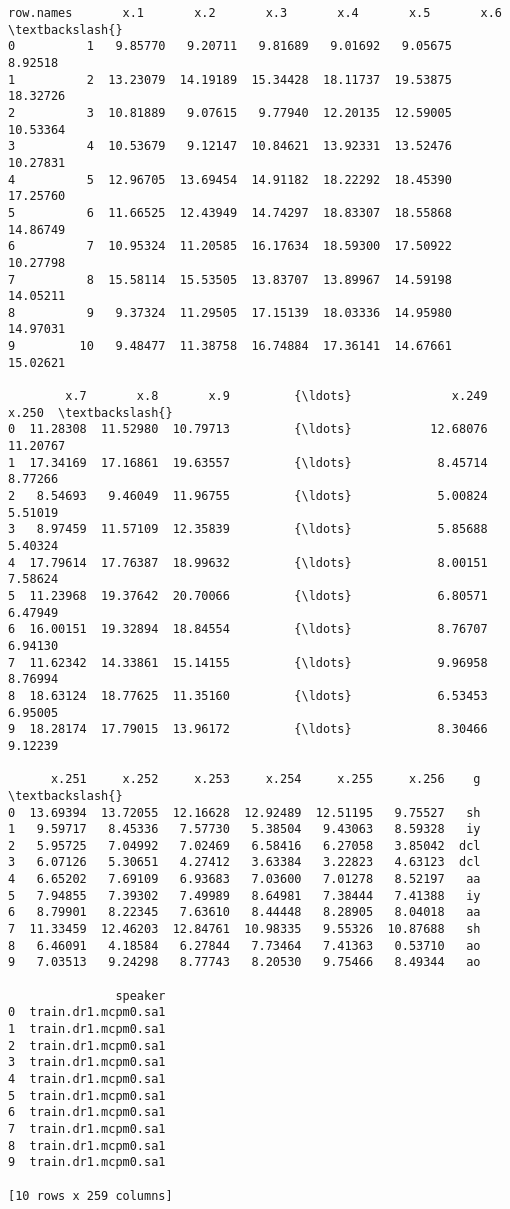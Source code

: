 \documentclass[11pt]{article}
\begin{document}
    \begin{Verbatim}[commandchars=\\\{\}]
   row.names       x.1       x.2       x.3       x.4       x.5       x.6  \textbackslash{}
0          1   9.85770   9.20711   9.81689   9.01692   9.05675   8.92518   
1          2  13.23079  14.19189  15.34428  18.11737  19.53875  18.32726   
2          3  10.81889   9.07615   9.77940  12.20135  12.59005  10.53364   
3          4  10.53679   9.12147  10.84621  13.92331  13.52476  10.27831   
4          5  12.96705  13.69454  14.91182  18.22292  18.45390  17.25760   
5          6  11.66525  12.43949  14.74297  18.83307  18.55868  14.86749   
6          7  10.95324  11.20585  16.17634  18.59300  17.50922  10.27798   
7          8  15.58114  15.53505  13.83707  13.89967  14.59198  14.05211   
8          9   9.37324  11.29505  17.15139  18.03336  14.95980  14.97031   
9         10   9.48477  11.38758  16.74884  17.36141  14.67661  15.02621   

        x.7       x.8       x.9         {\ldots}              x.249     x.250  \textbackslash{}
0  11.28308  11.52980  10.79713         {\ldots}           12.68076  11.20767   
1  17.34169  17.16861  19.63557         {\ldots}            8.45714   8.77266   
2   8.54693   9.46049  11.96755         {\ldots}            5.00824   5.51019   
3   8.97459  11.57109  12.35839         {\ldots}            5.85688   5.40324   
4  17.79614  17.76387  18.99632         {\ldots}            8.00151   7.58624   
5  11.23968  19.37642  20.70066         {\ldots}            6.80571   6.47949   
6  16.00151  19.32894  18.84554         {\ldots}            8.76707   6.94130   
7  11.62342  14.33861  15.14155         {\ldots}            9.96958   8.76994   
8  18.63124  18.77625  11.35160         {\ldots}            6.53453   6.95005   
9  18.28174  17.79015  13.96172         {\ldots}            8.30466   9.12239   

      x.251     x.252     x.253     x.254     x.255     x.256    g  \textbackslash{}
0  13.69394  13.72055  12.16628  12.92489  12.51195   9.75527   sh   
1   9.59717   8.45336   7.57730   5.38504   9.43063   8.59328   iy   
2   5.95725   7.04992   7.02469   6.58416   6.27058   3.85042  dcl   
3   6.07126   5.30651   4.27412   3.63384   3.22823   4.63123  dcl   
4   6.65202   7.69109   6.93683   7.03600   7.01278   8.52197   aa   
5   7.94855   7.39302   7.49989   8.64981   7.38444   7.41388   iy   
6   8.79901   8.22345   7.63610   8.44448   8.28905   8.04018   aa   
7  11.33459  12.46203  12.84761  10.98335   9.55326  10.87688   sh   
8   6.46091   4.18584   6.27844   7.73464   7.41363   0.53710   ao   
9   7.03513   9.24298   8.77743   8.20530   9.75466   8.49344   ao   

               speaker  
0  train.dr1.mcpm0.sa1  
1  train.dr1.mcpm0.sa1  
2  train.dr1.mcpm0.sa1  
3  train.dr1.mcpm0.sa1  
4  train.dr1.mcpm0.sa1  
5  train.dr1.mcpm0.sa1  
6  train.dr1.mcpm0.sa1  
7  train.dr1.mcpm0.sa1  
8  train.dr1.mcpm0.sa1  
9  train.dr1.mcpm0.sa1  

[10 rows x 259 columns]

    \end{Verbatim}
\end{document}
